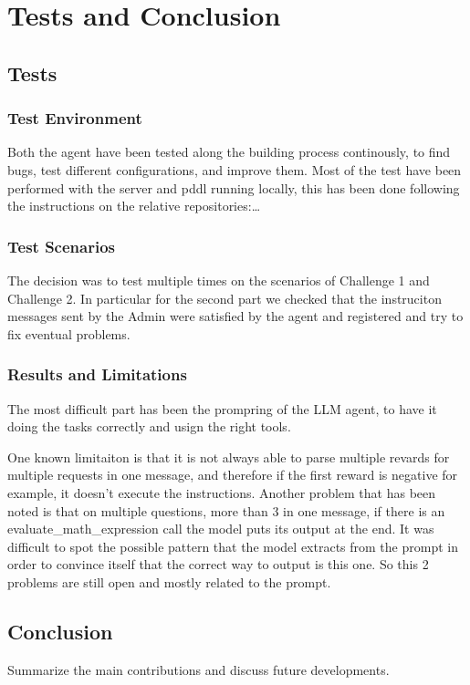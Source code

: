 \chapter{Tests and Conclusion}

\section{Tests}

\subsection{Test Environment}

Both the agent have been tested along the building process continously,
to find bugs, test different configurations, and improve them.
Most of the test have been performed with the server and pddl running locally, this has been
done following the instructions on the relative repositories:\dots

\subsection{Test Scenarios}

The decision was to test multiple times on the scenarios of Challenge 1 and Challenge 2.
In particular for the second part we checked that the instruciton messages sent by the Admin
were satisfied by the agent and registered and try to fix eventual problems.

\subsection{Results and Limitations}
\label{sub:res_and_lim}
The most difficult part has been the prompring of the LLM agent,
to have it doing the tasks correctly and usign the right tools.

One known limitaiton is that it is not always able to parse multiple revards for multiple requests
in one message, and therefore if the first reward is negative for example, it doesn't execute the instructions.
Another problem that has been noted is that on multiple questions, more than
3 in one message, if there is an evaluate\_math\_expression call the model puts its output at the end.
It was difficult to spot the possible pattern that the model extracts from the prompt
in order to convince itself that the correct way to output is this one. So this 2 problems are still open
and mostly related to the prompt.

\section{Conclusion}

Summarize the main contributions and discuss future developments.
